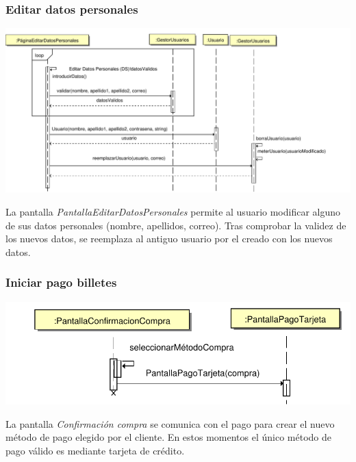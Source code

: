 \documentclass[11pt, a4paper, twoside, titlepage]{article}
\begin{document}
			\subsubsection{Editar datos personales}
				\begin{center}
					\includegraphics[scale=.64]{diseno/diagramas/editardatospersonales.pdf}
				\end{center}
				
				La pantalla {\itshape PantallaEditarDatosPersonales} permite al usuario modificar alguno de sus datos personales (nombre, apellidos, correo). Tras comprobar la validez de los nuevos datos, se reemplaza al antiguo usuario por el creado con los nuevos datos.
				

			\subsubsection{Iniciar pago billetes}
				\begin{center}
					\includegraphics[scale=.8]{diseno/diagramas/iniciarpagobilletes.pdf}
				\end{center}
				La pantalla {\itshape Confirmación compra} se comunica con el pago para crear el nuevo método de pago elegido por el cliente. En estos momentos el único método de pago válido es mediante tarjeta de crédito.
				
\end{document}

